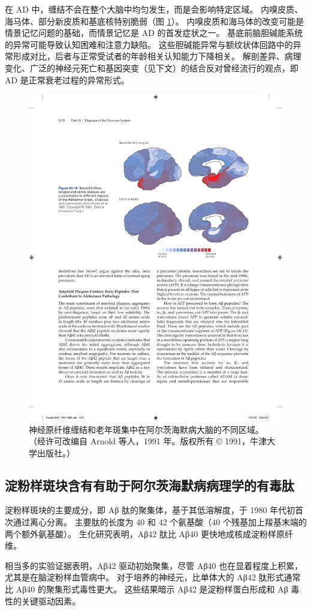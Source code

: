 在 AD 中，缠结不会在整个大脑中均匀发生，而是会影响特定区域。
内嗅皮质、海马体、部分新皮质和基底核特别脆弱（图 \ref{fig:64_10}）。
内嗅皮质和海马体的改变可能是情景记忆问题的基础，而情景记忆是 AD 的首发症状之一。
基底前脑胆碱能系统的异常可能导致认知困难和注意力缺陷。
这些胆碱能异常与额纹状体回路中的异常形成对比，后者与正常受试者的年龄相关认知能力下降相关。
解剖差异、病理变化、广泛的神经元死亡和基因突变（见下文）的结合反对曾经流行的观点，即 AD 是正常衰老过程的异常形式。


\begin{figure}[htbp]
	\centering
	\includegraphics[width=0.7\linewidth]{chap64/fig_64_10}
	\caption{神经原纤维缠结和老年斑集中在阿尔茨海默病大脑的不同区域。 （经许可改编自 Arnold 等人，1991 年。版权所有 © 1991，牛津大学出版社。）}
	\label{fig:64_10}
\end{figure}



\subsection{淀粉样斑块含有有助于阿尔茨海默病病理学的有毒肽}

淀粉样斑块的主要成分，即 Aβ 肽的聚集体，基于其低溶解度，于 1980 年代初首次通过离心分离。
主要肽的长度为 40 和 42 个氨基酸（40 个残基加上羧基末端的两个额外氨基酸）。
生化研究表明，Aβ42 肽比 Aβ40 更快地成核成淀粉样原纤维。


相当多的实验证据表明，Aβ42 驱动初始聚集，尽管 Aβ40 也在显着程度上积累，尤其是在脑淀粉样血管病中。
对于培养的神经元，比单体大的 Aβ42 肽形式通常比 Aβ40 的聚集形式毒性更大。
这些结果暗示 Aβ42 是淀粉样蛋白形成和 Aβ 毒性的关键驱动因素。


